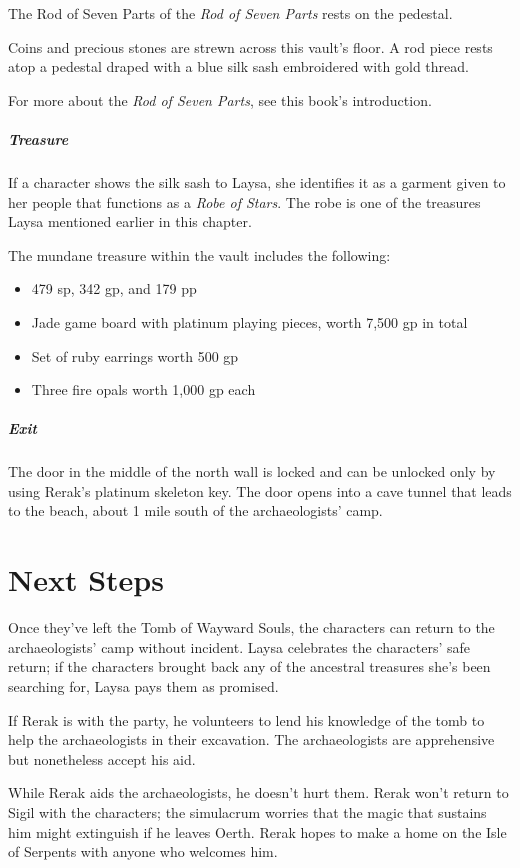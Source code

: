 \documentclass[10pt,a4paper,twoside,bg=print,twocolumn,openany,nodeprecatedcode]{dndbook}
\begin{document}
The Rod of Seven Parts of the \textit{Rod of Seven Parts} rests on the pedestal.

\begin{DndReadAloud}{}
Coins and precious stones are strewn across this vault's floor. A rod piece rests atop a pedestal draped with a blue silk sash embroidered with gold thread.

\end{DndReadAloud}

For more about the \textit{Rod of Seven Parts}, see this book's introduction.

\subparagraph{Treasure}
If a character shows the silk sash to Laysa, she identifies it as a garment given to her people that functions as a \textit{Robe of Stars}. The robe is one of the treasures Laysa mentioned earlier in this chapter.

The mundane treasure within the vault includes the following:


\begin{itemize}
\item 479 sp, 342 gp, and 179 pp
\item Jade game board with platinum playing pieces, worth 7,500 gp in total
\item Set of ruby earrings worth 500 gp
\item Three fire opals worth 1,000 gp each
\end{itemize}

\subparagraph{Exit}
The door in the middle of the north wall is locked and can be unlocked only by using Rerak's platinum skeleton key. The door opens into a cave tunnel that leads to the beach, about 1 mile south of the archaeologists' camp.

\section{Next Steps}
Once they've left the Tomb of Wayward Souls, the characters can return to the archaeologists' camp without incident. Laysa celebrates the characters' safe return; if the characters brought back any of the ancestral treasures she's been searching for, Laysa pays them as promised.

If Rerak is with the party, he volunteers to lend his knowledge of the tomb to help the archaeologists in their excavation. The archaeologists are apprehensive but nonetheless accept his aid.

While Rerak aids the archaeologists, he doesn't hurt them. Rerak won't return to Sigil with the characters; the simulacrum worries that the magic that sustains him might extinguish if he leaves Oerth. Rerak hopes to make a home on the Isle of Serpents with anyone who welcomes him.
\end{document}

